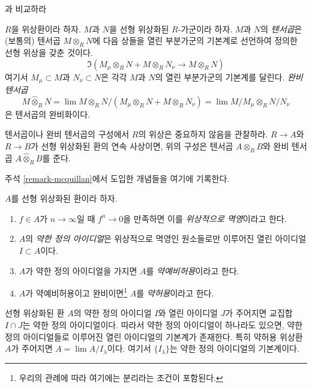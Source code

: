 \begin{definition}
\label{definition-toplogy-tensor-product}
\begin{reference}
\cite[0, Section 7.7]{EGA}과 비교하라
\end{reference}
$R$을 위상환이라 하자. $M$과 $N$을 선형 위상화된 $R$-가군이라
하자. $M$과 $N$의 {\it 텐서곱}은 (보통의) 텐서곱
$M \otimes_R N$에 다음 상들을 열린 부분가군의 기본계로 선언하여
정의한 선형 위상을 갖춘 것이다.
$$
\Im(M_\mu \otimes_R N + M \otimes_R N_\nu \longrightarrow M \otimes_R N)
$$
여기서 $M_\mu \subset M$과 $N_\nu \subset N$은 각각 $M$과 $N$의
열린 부분가군의 기본계를 달린다. {\it 완비 텐서곱}
$$
M \widehat{\otimes}_R N =
\lim M \otimes_R N/(M_\mu \otimes_R N + M \otimes_R N_\nu) =
\lim M/M_\mu \otimes_R N/N_\nu
$$
은 텐서곱의 완비화이다.
\end{definition}

\noindent
텐서곱이나 완비 텐서곱의 구성에서 $R$의 위상은 중요하지 않음을
관찰하라. $R \to A$와 $R \to B$가 선형 위상화된 환의 연속 사상이면,
위의 구성은 텐서곱 $A \otimes_R B$와 완비 텐서곱
$A \widehat{\otimes}_R B$를 준다.

\medskip\noindent
주석 \ref{remark-mcquillan}에서 도입한 개념들을 여기에 기록한다.

\begin{definition}
\label{definition-weakly-admissible}
$A$를 선형 위상화된 환이라 하자.
\begin{enumerate}
\item $f \in A$가 $n \to \infty$일 때 $f^n \to 0$을 만족하면
이를 {\it 위상적으로 멱영}이라고 한다.
\item $A$의 {\it 약한 정의 아이디얼}은 위상적으로 멱영인 원소들로만
이루어진 열린 아이디얼 $I \subset A$이다.
\item $A$가 약한 정의 아이디얼을 가지면 $A$를
{\it 약예비허용}이라고 한다.
\item $A$가 약예비허용이고 완비이면\footnote{우리의 관례에 따라
여기에는 분리라는 조건이 포함된다.} $A$를 {\it 약허용}이라고 한다.
\end{enumerate}
\end{definition}

\noindent
선형 위상화된 환 $A$의 약한 정의 아이디얼 $I$와 열린 아이디얼
$J$가 주어지면 교집합 $I \cap J$는 약한 정의 아이디얼이다.
따라서 약한 정의 아이디얼이 하나라도 있으면, 약한 정의
아이디얼들로 이루어진 열린 아이디얼의 기본계가 존재한다.
특히 약허용 위상환 $A$가 주어지면
$A = \lim A/I_\lambda$이다. 여기서 $\{I_\lambda\}$는 약한 정의
아이디얼의 기본계이다.

